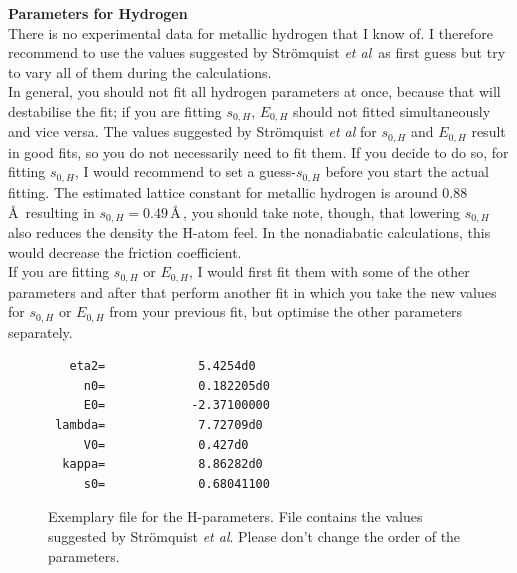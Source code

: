 \documentclass[11pt,oneside,a4paper, captions=nooneline, headsepline]{article}%
\begin{document}
\textbf{Parameters for Hydrogen}\\
There is no experimental data for metallic hydrogen that I know of. I therefore recommend to use the values suggested by Strömquist \emph{et al}\,\cite{strom98} as first guess but try to vary all of them during the calculations.\\
In general, you should not fit all hydrogen parameters at once, because that will destabilise the fit; if you are fitting $s_{0,H}$, $E_{0,H}$ should not fitted simultaneously and vice versa. The values suggested by Strömquist \emph{et al} for $s_{0,H}$ and $E_{0,H}$ result in good fits, so you do not necessarily need to fit them. If you decide to do so, for fitting $s_{0,H}$, I would recommend to set a guess-$s_{0,H}$ before you start the actual fitting. The estimated lattice constant for metallic hydrogen is around 0.88\,\AA~resulting in $s_{0,H}=0.49$\,\AA\,\cite{wigner35}, you should take note, though, that lowering $s_{0,H}$ also reduces the density the H-atom feel. In the nonadiabatic calculations, this would decrease the friction coefficient.\\
If you are fitting $s_{0,H}$ or $E_{0,H}$, I would first fit them with some of the other parameters and after that perform another fit in which you take the new values for $s_{0,H}$ or $E_{0,H}$ from your previous fit, but optimise the other parameters separately.\\
\begin{figure}[H!!!]
\begin{verbatim}
   eta2=             5.4254d0
     n0=             0.182205d0
     E0=            -2.37100000
 lambda=             7.72709d0
     V0=             0.427d0
  kappa=             8.86282d0
     s0=             0.68041100
\end{verbatim}
\caption{Exemplary file for the H-parameters. File contains the values suggested by Strömquist \emph{et al}. Please don't change the order of the parameters.}
\label{Mdtianfit}
\end{figure}
\end{document}
